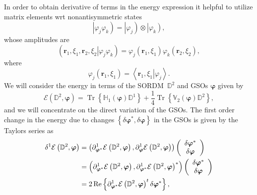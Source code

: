 \documentclass[aps,preprint]{revtex4}%
\begin{document}
In order to obtain derivative of terms in the energy expression it helpful to
utilize matrix elements wrt nonantisymmetric states
\begin{equation}
\left\vert \varphi_{j}\varphi_{k}\right)  =\left\vert \varphi_{j}\right)
\otimes\left\vert \varphi_{k}\right)  ,
\end{equation}
whose amplitudes are
\begin{equation}
\left(  \left.  \boldsymbol{r}_{1},\xi_{1},\boldsymbol{r}_{2},\xi
_{2}\right\vert \varphi_{j}\varphi_{k}\right)  =\varphi_{j}\left(
\boldsymbol{r}_{1},\xi_{1}\right)  \varphi_{k}\left(  \boldsymbol{r}_{2}%
,\xi_{2}\right)  ,
\end{equation}
where
\begin{equation}
\varphi_{j}\left(  \boldsymbol{r}_{1},\xi_{1}\right)  =\left\langle \left.
\boldsymbol{r}_{1},\xi_{1}\right\vert \varphi_{j}\right\rangle .
\end{equation}
We will consider the energy in terms of the SORDM\ $\mathbb{D}^{2}$ and GSOs
$\boldsymbol{\varphi}$ given by
\begin{equation}
\mathcal{E}\left(  \mathbb{D}^{2},\boldsymbol{\varphi}\right)
=\operatorname{Tr}\left\{  \mathbb{H}_{1}\left(  \boldsymbol{\varphi}\right)
\mathbb{D}^{1}\right\}  +\frac{1}{4}\operatorname{Tr}\left\{  \mathbb{V}%
_{2}\left(  \boldsymbol{\varphi}\right)  \mathbb{D}^{2}\right\}  , \label{e1}%
\end{equation}
and we will concentrate on the direct variation of the GSOs. The first order
change in the energy due to changes $\left\{  \delta\boldsymbol{\varphi}%
^{\ast},\delta\boldsymbol{\varphi}\right\}  $ in the GSOs is given by the
Taylors series as
\begin{align}
\delta^{1}\mathcal{E}\left(  \mathbb{D}^{2},\boldsymbol{\varphi}\right)   &
=\left(  \partial_{\boldsymbol{\varphi}^{\ast}}^{1}\mathcal{E}\left(
\mathbb{D}^{2},\boldsymbol{\varphi}\right)  ,\partial_{\boldsymbol{\varphi}%
}^{1}\mathcal{E}\left(  \mathbb{D}^{2},\boldsymbol{\varphi}\right)  \right)
\left(
\begin{array}
[c]{c}%
\delta\boldsymbol{\varphi}^{\ast}\\
\delta\boldsymbol{\varphi}%
\end{array}
\right) \nonumber\\
&  =\left(  \partial_{\boldsymbol{\varphi}^{\ast}}^{1}\mathcal{E}\left(
\mathbb{D}^{2},\boldsymbol{\varphi}\right)  ,\partial_{\boldsymbol{\varphi
}^{\ast}}^{1}\mathcal{E}\left(  \mathbb{D}^{2},\boldsymbol{\varphi}\right)
^{\ast}\right)  \left(
\begin{array}
[c]{c}%
\delta\boldsymbol{\varphi}^{\ast}\\
\delta\boldsymbol{\varphi}%
\end{array}
\right) \nonumber\\
&  =2\operatorname{Re}\left\{  \partial_{\boldsymbol{\varphi}^{\ast}}%
^{1}\mathcal{E}\left(  \mathbb{D}^{2},\boldsymbol{\varphi}\right)  ^{t}%
\delta\boldsymbol{\varphi}^{\ast}\right\}  ,
\end{align}
\end{document}
